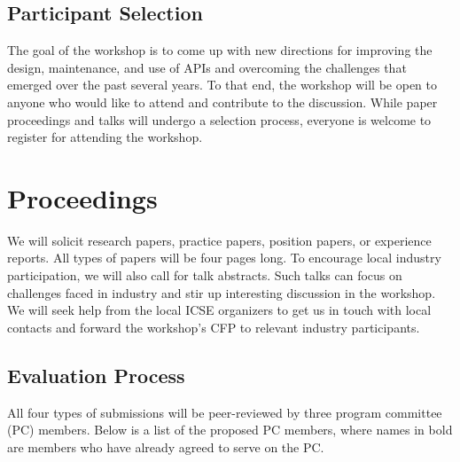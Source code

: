 \documentclass[sigconf]{acmart}
\begin{document}
\subsection{Participant Selection}
The goal of the workshop is to come up with new directions for improving the design, maintenance, and use of APIs and overcoming the challenges that emerged over the past several years. To that end, the workshop will be open to anyone who would like to attend and contribute to the discussion. While paper proceedings and talks will undergo a selection process, everyone is welcome to register for attending the workshop. 

\section{Proceedings}

We will solicit research papers, practice papers, position papers, or experience reports. All types of papers will be four pages long. To encourage local industry participation, we will also call for talk abstracts. Such talks can focus on challenges faced in industry and stir up interesting discussion in the workshop. We will seek help from the local ICSE organizers to get us in touch with local contacts and forward the workshop's CFP to relevant industry participants.

\subsection{Evaluation Process}
All four types of submissions will be peer-reviewed by three program committee (PC) members. Below is a list of the proposed PC members, where names in bold are members who have already agreed to serve on the PC\@.
\end{document}
